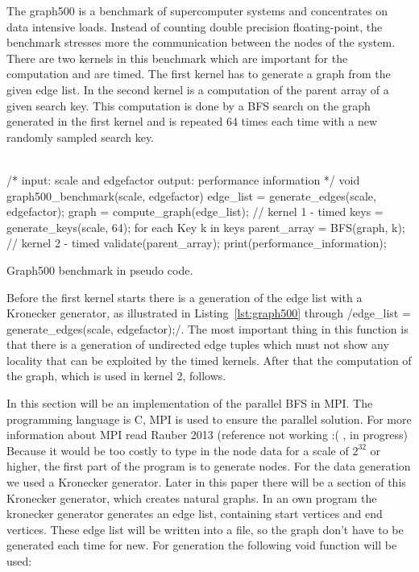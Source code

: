 \documentclass[12pt,a4paper]{article}
\begin{document}
The graph500 \cite{graph500} is a benchmark of supercomputer systems and concentrates on data intensive loads. Instead of counting double precision floating-point, the benchmark stresses more the communication between the nodes of the system. There are two kernels in this benchmark which are important for the computation and are timed. The first kernel has to generate a graph from the given edge list. In the second kernel is a computation of the parent array of a given search key. This computation is done by a BFS search on the graph generated in the first kernel and is repeated 64 times each time with a new randomly sampled search key.\\
\\
\begin{listing}[H]
\begin{ccode}
/*
input: scale and edgefactor
output: performance information
*/
void graph500_benchmark(scale, edgefactor){
	edge_list = generate_edges(scale, edgefactor);
	graph = compute_graph(edge_list); // kernel 1 - timed
	keys = generate_keys(scale, 64);
	for each Key k in keys{
		parent_array = BFS(graph, k);   // kernel 2 - timed
		validate(parent_array);
	}
	print(performance_information);
}
\end{ccode}
\caption{Graph500 benchmark in pseudo code.}
\label{lst:graph500}
\end{listing}

Before the first kernel starts there is a generation of the edge list with a Kronecker generator, as illustrated in Listing~\ref{lst:graph500} through \cinline/edge_list = generate_edges(scale, edgefactor);/. The most important thing in this function is that there is a generation of undirected edge tuples which must not show any locality that can be exploited by the timed kernels. After that the computation of the graph, which is used in kernel 2, follows.

In this section will be an implementation of the parallel BFS in MPI. The programming language is C, MPI is used to ensure the parallel solution. For more information about MPI read Rauber 2013 (reference not working :( , in progress)\\
Because it would be too costly to type in the node data for a scale of \(2^{32}\) or higher, the first part of the program is to generate nodes. For the data generation we used a Kronecker generator. Later in this paper there will be a section of this Kronecker generator, which creates natural graphs. In an own program the kronecker generator generates an edge list, containing start vertices and end vertices. These edge list will be written into a file, so the graph don't have to be generated each time for new. For generation the following void function will be used:
\end{document}
